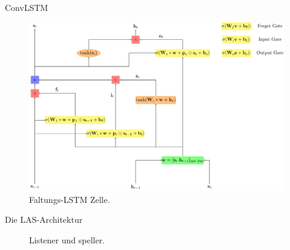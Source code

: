 \documentclass[10pt]{beamer}
\begin{document}
\begin{frame}{ConvLSTM}
\begin{figure}
\includegraphics[scale=0.55]{../tikz/convLSTM}
\caption{Faltungs-LSTM Zelle.}
\end{figure}
\end{frame}


\begin{frame}{Die LAS-Architektur}
	\begin{figure}
		\caption{Listener und speller.}
	\end{figure}
\end{frame}
\end{document}

